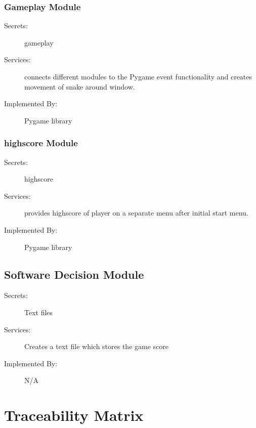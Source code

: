 \documentclass[12pt, titlepage]{article}
\begin{document}
\subsubsection{Gameplay Module}

\begin{description}
\item[Secrets:] gameplay 
\item[Services:] connects different modules to the Pygame event functionality and 
creates movement of snake around window.
\item[Implemented By:] Pygame library
\end{description}

\subsubsection{highscore Module}

\begin{description}
\item[Secrets:]  highscore
\item[Services:] provides highscore of player on a separate menu
after initial start menu.
\item[Implemented By:] Pygame library
\end{description}

\subsection{Software Decision Module}

\begin{description}
\item[Secrets:] Text files
\item[Services:] Creates a text file which stores the game score 
\item[Implemented By:] N/A
\end{description}


\section{Traceability Matrix} \label{SecTM}
\end{document}

